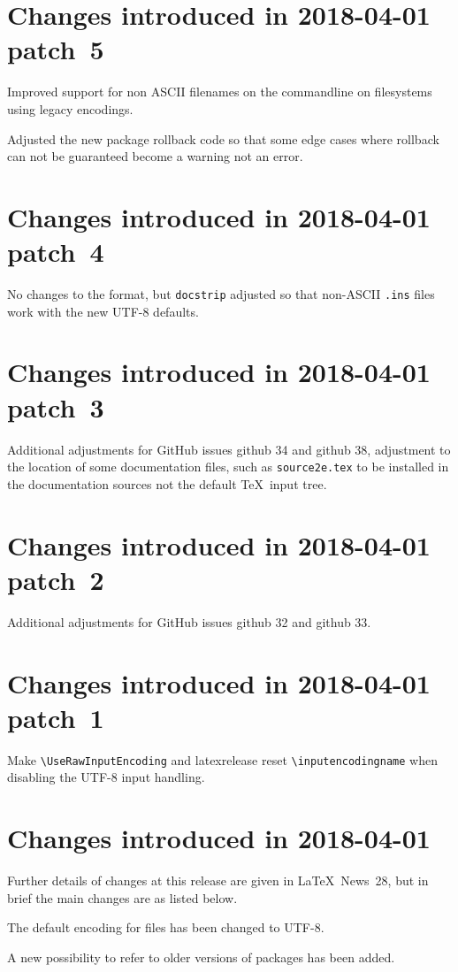\documentclass{ltxguide}
\newcommand\Lpack[1]{\mbox{\textsf{#1}}}
\newcommand\ghissue[1]{github #1}
\newcommand\ltnewsissue[1]{\LaTeX\ News~#1}
\newcommand\ghissue[1]{%
    \href{https://github.com/latex3/latex2e/issues/#1}{github #1}}
\newcommand\ltnewsissue[1]{%
    \href{https://www.latex-project.org/news/latex2e-news/ltnews#1.pdf}{\LaTeX\ News~#1}}
\begin{document}
\section{Changes  introduced in 2018-04-01 patch~5}
Improved support for non ASCII filenames on the commandline on
filesystems using legacy encodings.

Adjusted the new package rollback code so that some edge cases where rollback
can not be guaranteed become a warning not an error.

\section{Changes  introduced in 2018-04-01 patch~4}
No changes to the format, but \texttt{docstrip} adjusted so that non-ASCII
\texttt{.ins} files work with the new UTF-8 defaults.

\section{Changes  introduced in 2018-04-01 patch~3}
Additional adjustments for GitHub issues \ghissue{34} and \ghissue{38}, adjustment to the
location of some documentation files, such as \texttt{source2e.tex} to
be installed in the documentation sources not the default \TeX\ input
tree.


\section{Changes  introduced in 2018-04-01 patch~2}
Additional adjustments for GitHub issues  \ghissue{32} and  \ghissue{33}.

\section{Changes  introduced in 2018-04-01 patch~1}
Make \verb|\UseRawInputEncoding| and \Lpack{latexrelease} reset \verb|\inputencodingname|
when disabling the UTF-8 input handling.

\section{Changes  introduced in 2018-04-01}
Further details of changes at this release are given in \ltnewsissue{28}, but in brief
the main changes are as listed below.

The default encoding for files has been changed to UTF-8.

A new possibility to refer to older versions of packages has been added.
\end{document}
